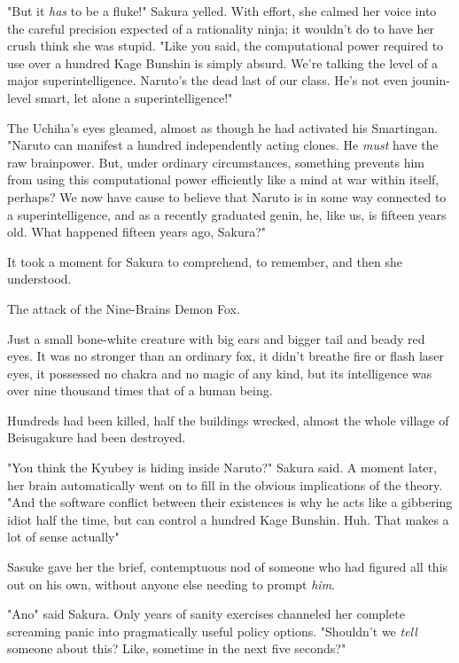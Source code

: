 "But it \emph{has} to be a fluke!" Sakura yelled. With effort, she calmed her
voice into the careful precision expected of a rationality ninja; it wouldn't
do to have her crush think she was stupid. "Like you said, the computational
power required to use over a hundred Kage Bunshin is simply absurd. We're
talking the level of a major superintelligence. Naruto's the dead last of our
class. He's not even jounin-level smart, let alone a superintelligence!"

The Uchiha's eyes gleamed, almost as though he had activated his Smartingan.
"Naruto can manifest a hundred independently acting clones. He \emph{must} have
the raw brainpower. But, under ordinary circumstances, something prevents him
from using this computational power efficiently{\el} like a mind at war
within itself, perhaps? We now have cause to believe that Naruto is in some way
connected to a superintelligence, and as a recently graduated genin, he, like
us, is fifteen years old. What happened fifteen years ago, Sakura?"

It took a moment for Sakura to comprehend, to remember, and then she understood.

The attack of the Nine-Brains Demon Fox.

Just a small bone-white creature with big ears and bigger tail and beady red
eyes. It was no stronger than an ordinary fox, it didn't breathe fire or flash
laser eyes, it possessed no chakra and no magic of any kind, but its
intelligence was over nine thousand times that of a human being.

Hundreds had been killed, half the buildings wrecked, almost the whole village
of Beisugakure had been destroyed.

"You think the Kyubey is hiding inside Naruto?" Sakura said. A moment later,
her brain automatically went on to fill in the obvious implications of the
theory. "And the software conflict between their existences is why he acts like
a gibbering idiot half the time, but can control a hundred Kage Bunshin. Huh.
That makes{\el} a lot of sense{\el} actually{\el}"

Sasuke gave her the brief, contemptuous nod of someone who had figured all this
out on his own, without anyone else needing to prompt \emph{him}.

"Ano{\el}" said Sakura. Only years of sanity exercises channeled her
complete screaming panic into pragmatically useful policy options. "Shouldn't
we{\el} \emph{tell} someone about this? Like, sometime in the next five
seconds?"

